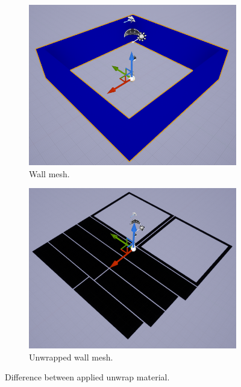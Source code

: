 \begin{figure}[!ht]\centering
    \begin{subfigure}[b]{0.48\textwidth}
        \centering
        \includegraphics[width=\textwidth]{img/unwrap-method-original-mesh.png}
        \caption{Wall mesh.}
    \end{subfigure}
    \hfill
    \begin{subfigure}[b]{0.48\textwidth}
        \centering
        \includegraphics[width=\textwidth]{img/unwrap-method-mesh.png}
        \caption{Unwrapped wall mesh.}
    \end{subfigure}
    \caption{Difference between applied unwrap material.}
    \label{fig:unwrapped-mesh}
\end{figure}

